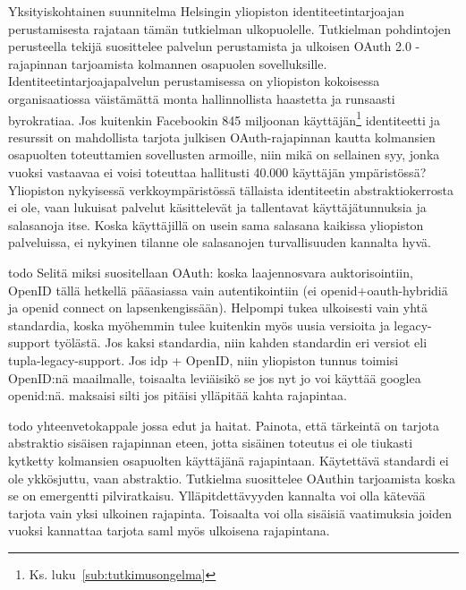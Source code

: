 \documentclass[finnish,gradu]{tktltiki}
\begin{document}
  Yksityiskohtainen suunnitelma Helsingin yliopiston identiteetintarjoajan perustamisesta rajataan tämän tutkielman ulkopuolelle. Tutkielman pohdintojen perusteella tekijä suosittelee palvelun perustamista ja ulkoisen OAuth 2.0 -rajapinnan tarjoamista kolmannen osapuolen sovelluksille. Identiteetintarjoajapalvelun perustamisessa on yliopiston kokoisessa organisaatiossa väistämättä monta hallinnollista haastetta ja runsaasti byrokratiaa. Jos kuitenkin Facebookin 845 miljoonan käyttäjän\footnote{Ks. luku~\ref{sub:tutkimusongelma}} identiteetti ja resurssit on mahdollista tarjota julkisen OAuth-rajapinnan kautta kolmansien osapuolten toteuttamien sovellusten armoille, niin mikä on sellainen syy, jonka vuoksi vastaavaa ei voisi toteuttaa hallitusti 40.000 käyttäjän ympäristössä? Yliopiston nykyisessä verkkoympäristössä tällaista identiteetin abstraktiokerrosta ei ole, vaan lukuisat palvelut käsittelevät ja tallentavat käyttäjätunnuksia ja salasanoja itse. Koska käyttäjillä on usein sama salasana kaikissa yliopiston palveluissa, ei nykyinen tilanne ole salasanojen turvallisuuden kannalta hyvä.

  todo Selitä miksi suositellaan OAuth: koska laajennosvara auktorisointiin, OpenID tällä hetkellä pääasiassa vain autentikointiin (ei openid+oauth-hybridiä ja openid connect on lapsenkengissään). Helpompi tukea ulkoisesti vain yhtä standardia, koska myöhemmin tulee kuitenkin myös uusia versioita ja legacy-support työlästä. Jos kaksi standardia, niin kahden standardin eri versiot eli tupla-legacy-support. Jos idp + OpenID, niin yliopiston tunnus toimisi OpenID:nä maailmalle, toisaalta leviäisikö se jos nyt jo voi käyttää googlea openid:nä. maksaisi silti jos pitäisi ylläpitää kahta rajapintaa.

  todo yhteenvetokappale jossa edut ja haitat. Painota, että tärkeintä on tarjota abstraktio sisäisen rajapinnan eteen, jotta sisäinen toteutus ei ole tiukasti kytketty kolmansien osapuolten käyttäjänä rajapintaan. Käytettävä standardi ei ole ykkösjuttu, vaan abstraktio. Tutkielma suosittelee OAuthin tarjoamista koska se on emergentti pilviratkaisu. Ylläpitdettävyyden kannalta voi olla kätevää tarjota vain yksi ulkoinen rajapinta. Toisaalta voi olla sisäisiä vaatimuksia joiden vuoksi kannattaa tarjota saml myös ulkoisena rajapintana.

\end{document}
